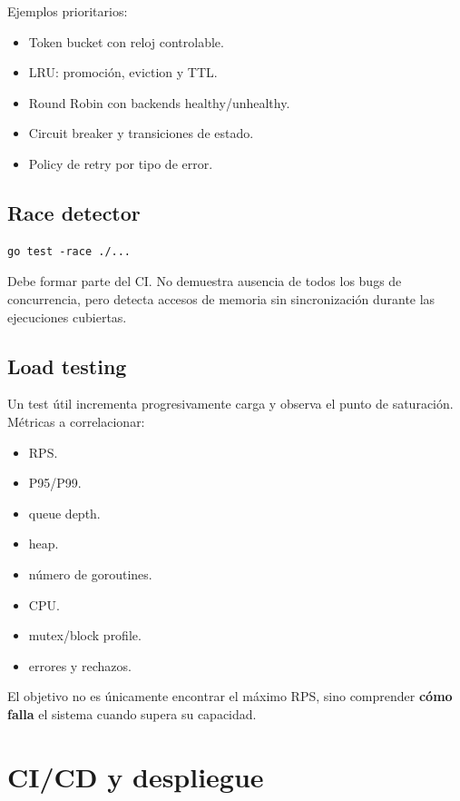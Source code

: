 \documentclass[11pt,a4paper]{article}
\begin{document}
Ejemplos prioritarios:

\begin{itemize}
  \item Token bucket con reloj controlable.
  \item LRU: promoción, eviction y TTL.
  \item Round Robin con backends healthy/unhealthy.
  \item Circuit breaker y transiciones de estado.
  \item Policy de retry por tipo de error.
\end{itemize}

\subsection{Race detector}

\begin{verbatim}
go test -race ./...
\end{verbatim}

Debe formar parte del CI. No demuestra ausencia de todos los bugs de concurrencia, pero detecta accesos de memoria sin sincronización durante las ejecuciones cubiertas.

\subsection{Load testing}

Un test útil incrementa progresivamente carga y observa el punto de saturación. Métricas a correlacionar:

\begin{itemize}
  \item RPS.
  \item P95/P99.
  \item queue depth.
  \item heap.
  \item número de goroutines.
  \item CPU.
  \item mutex/block profile.
  \item errores y rechazos.
\end{itemize}

El objetivo no es únicamente encontrar el máximo RPS, sino comprender \textbf{cómo falla} el sistema cuando supera su capacidad.

\section{CI/CD y despliegue}
\end{document}
